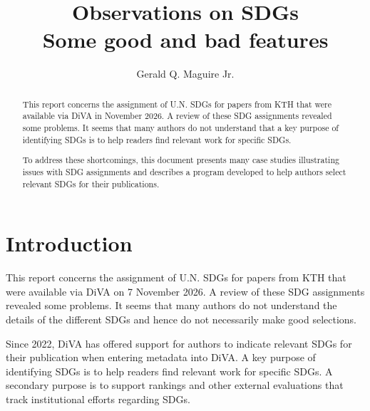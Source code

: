 
\title{Observations on SDGs\\[0.2em]\smaller{}Some good and bad features}
\author{Gerald Q. Maguire Jr.}




\maketitle
{}
\setcounter{page}{1}
\begin{abstract}
This report concerns the assignment of U.N. \glspl{SDG} for papers from \gls{KTH} that were available via \gls{DiVA} in November 2026. A review of these \gls{SDG} assignments revealed some problems. It seems that many authors do not understand that a key purpose of identifying \glspl{SDG} is to help readers find relevant work for specific \glspl{SDG}.

To address these shortcomings, this document presents many case studies illustrating issues with \gls{SDG} assignments and describes a program developed to help authors select relevant \glspl{SDG} for their publications.
\end{abstract}
\clearpage
\tableofcontents

\glsresetall  %
\clearpage
{}
\setcounter{page}{1}
\section{Introduction}
\label{sec:intro}

This report concerns the assignment of U.N. \glspl{SDG} for papers from \gls{KTH} that were available via \gls{DiVA} on 7 November 2026. A review of these \gls{SDG} assignments revealed some problems. It seems that many authors do not understand the details of the different \glspl{SDG} and hence do not necessarily make good selections.

Since 2022, \gls{DiVA} has offered support for authors to indicate relevant \glspl{SDG} for their publication when entering metadata into \gls{DiVA}. A key purpose of identifying \glspl{SDG} is to help readers find relevant work for specific \glspl{SDG}. A secondary purpose is to support rankings and other external evaluations that track institutional efforts regarding \glspl{SDG}.

